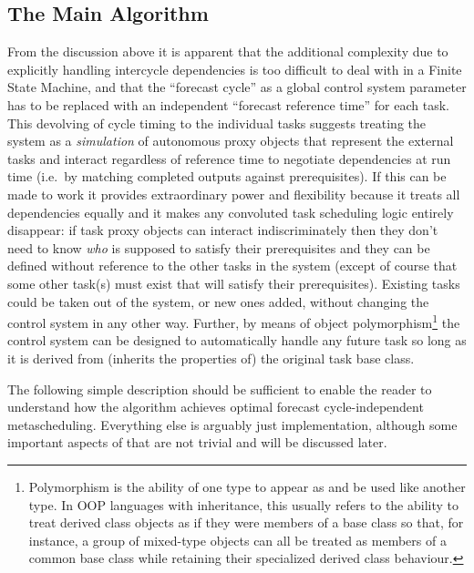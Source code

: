 \documentclass[11pt,a4paper]{article}
\begin{document}
\subsection{The Main Algorithm}

From the discussion above it is apparent that the additional complexity
due to explicitly handling intercycle dependencies is too difficult to
deal with in a Finite State Machine, and that the ``forecast cycle'' as
a global control system parameter has to be replaced with an independent
``forecast reference time'' for each task. This devolving of cycle
timing to the individual tasks suggests treating the system as a {\em
simulation} of autonomous proxy objects that represent the external
tasks and interact regardless of reference time to negotiate
dependencies at run time (i.e.\ by matching completed outputs against
prerequisites). If this can be made to work it provides extraordinary
power and flexibility because it treats all dependencies equally and it
makes any convoluted task scheduling logic entirely disappear: if task
proxy objects can interact indiscriminately then they don't need to know
{\em who} is supposed to satisfy their prerequisites and they can be
defined without reference to the other tasks in the system (except of
course that some other task(s) must exist that will satisfy their
prerequisites).  Existing tasks could be taken out of the system, or new
ones added, without changing the control system in any other way.
Further, by means of object polymorphism\footnote{Polymorphism is the
ability of one type to appear as and be used like another type. In OOP
languages with inheritance, this usually refers to the ability to treat
derived class objects as if they were members of a base class so that,
for instance, a group of mixed-type objects can all be treated as
members of a common base class while retaining their specialized derived
class behaviour.} the control system can be designed to automatically
handle any future task so long as it is derived from (inherits the
properties of) the original task base class.

The following simple description should be sufficient to enable the
reader to understand how the algorithm achieves optimal forecast
cycle-independent metascheduling. Everything else is arguably just
implementation, although some important aspects of that are not trivial
and will be discussed later.
\end{document}
